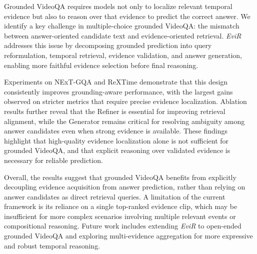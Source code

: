 Grounded VideoQA requires models not only to localize relevant temporal evidence but also to reason over that evidence to predict the correct answer. We identify a key challenge in multiple-choice grounded VideoQA: the mismatch between answer-oriented candidate text and evidence-oriented retrieval. \emph{EviR} addresses this issue by decomposing grounded prediction into query reformulation, temporal retrieval, evidence validation, and answer generation, enabling more faithful evidence selection before final reasoning.

Experiments on NExT-GQA and ReXTime demonstrate that this design consistently improves grounding-aware performance, with the largest gains observed on stricter metrics that require precise evidence localization. Ablation results further reveal that the Refiner is essential for improving retrieval alignment, while the Generator remains critical for resolving ambiguity among answer candidates even when strong evidence is available. These findings highlight that high-quality evidence localization alone is not sufficient for grounded VideoQA, and that explicit reasoning over validated evidence is necessary for reliable prediction.

Overall, the results suggest that grounded VideoQA benefits from explicitly decoupling evidence acquisition from answer prediction, rather than relying on answer candidates as direct retrieval queries. A limitation of the current framework is its reliance on a single top-ranked evidence clip, which may be insufficient for more complex scenarios involving multiple relevant events or compositional reasoning. Future work includes extending \emph{EviR} to open-ended grounded VideoQA and exploring multi-evidence aggregation for more expressive and robust temporal reasoning.
